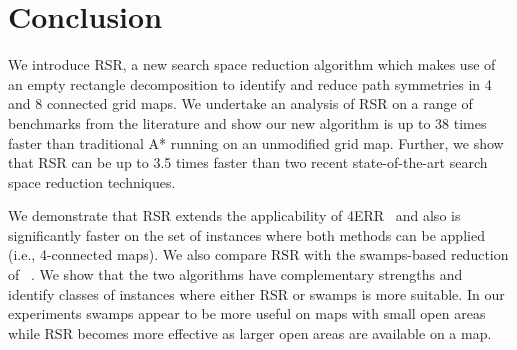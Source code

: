 \section{Conclusion}
We introduce RSR, a new search space reduction algorithm which makes use of an
empty rectangle decomposition to identify and reduce path symmetries in
4 and 8 connected grid maps.  We undertake an analysis of RSR on a range of
benchmarks from the literature and show our new algorithm is up to 38 times
faster than traditional A* running on an unmodified grid map.  Further, we show
that RSR can be up to 3.5 times faster than two recent state-of-the-art search
space reduction techniques.
\par
We demonstrate that RSR extends the applicability of 4ERR~\cite{harabor10}
and also is
significantly faster on the set of instances where both methods can be applied
(i.e., 4-connected maps).  We also compare RSR with the swamps-based reduction
of \citeauthor{pochter10}~.  We show that the two
algorithms have complementary strengths and identify classes of instances where
either RSR or swamps is more suitable.  In our experiments swamps appear to be
more useful on maps with small open areas while RSR becomes more effective as
larger open areas are available on a map.
\par



